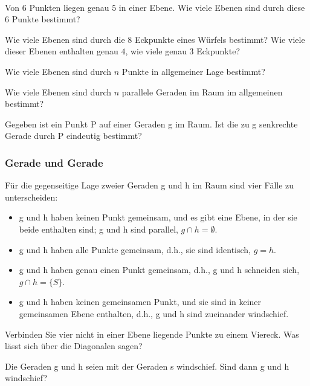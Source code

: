 \documentclass[%
11pt,%
twoside,%
titlepage,%
a4page,%
german,%
headsepline%
]{scrartcl}
\begin{document}
\begin{ueb} \ \\[-4ex]
\begin{enumeratea}
\item Von $6$ Punkten liegen genau $5$ in einer Ebene. Wie viele Ebenen sind durch diese $6$ Punkte bestimmt?
\item Wie viele Ebenen sind durch die $8$ Eckpunkte eines W\"urfels bestimmt? Wie viele dieser Ebenen enthalten genau $4$, wie viele genau $3$ Eckpunkte?
\item Wie viele Ebenen sind durch $n$ Punkte in allgemeiner Lage bestimmt?
\item Wie viele Ebenen sind durch $n$ parallele Geraden im Raum im allgemeinen bestimmt?
\end{enumeratea}
\end{ueb}

\begin{ueb}
Gegeben ist ein Punkt P auf einer Geraden g im Raum. Ist die zu g senkrechte Gerade durch P eindeutig bestimmt?
\end{ueb}

\subsubsection{Gerade und Gerade}
F\"ur die gegenseitige Lage zweier Geraden g und h im Raum sind vier F\"alle zu unterscheiden:
\begin{itemize}
\item g und h haben keinen Punkt gemeinsam, und es gibt eine Ebene, in der sie beide enthalten sind; g und h sind parallel, $g\cap h=\emptyset$.
\item g und h haben alle Punkte gemeinsam, d.h., sie sind identisch, $g=h$.
\item g und h haben genau einen Punkt gemeinsam, d.h., g und h schneiden sich, $g\cap h=\{S\}$.
\item g und h haben keinen gemeinsamen Punkt, und sie sind in keiner gemeinsamen Ebene enthalten, d.h., g und h sind zueinander windschief.
\end{itemize}

\begin{ueb}
Verbinden Sie vier nicht in einer Ebene liegende Punkte zu einem Viereck. Was l\"asst sich \"uber die Diagonalen sagen?
\end{ueb}
\begin{ueb}
Die Geraden g und h seien mit der Geraden s windschief. Sind dann g und h windschief?
\end{ueb}
\end{document}
